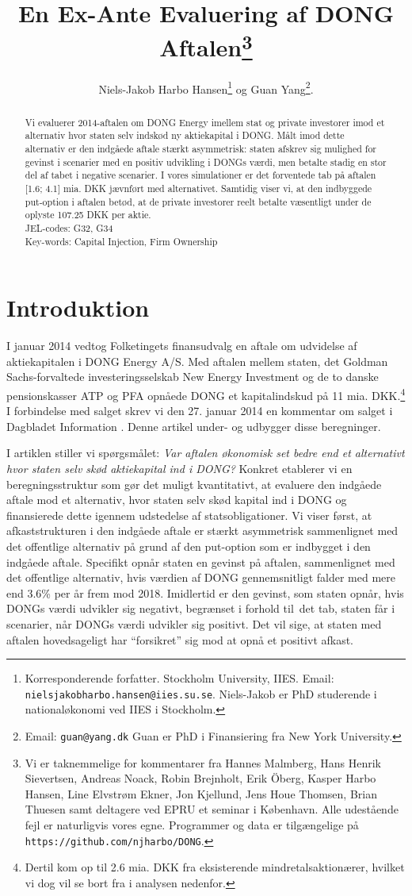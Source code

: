 \documentclass{article}
\title{En Ex-Ante Evaluering af DONG Aftalen\thanks{Vi er taknemmelige for kommentarer fra Hannes Malmberg, Hans Henrik Sievertsen, Andreas Noack, Robin Brejnholt, Erik {\"O}berg, Kasper Harbo Hansen, Line Elvstrøm Ekner, Jon Kjellund,  Jens Houe Thomsen, Brian Thuesen samt deltagere ved EPRU et seminar i København. Alle udestående fejl er naturligvis vores egne.  Programmer og data er tilgængelige på \texttt{https://github.com/njharbo/DONG}.} \\ }
\author{Niels-Jakob Harbo Hansen\thanks{Korresponderende forfatter. Stockholm University, IIES.  Email: \texttt{nielsjakobharbo.hansen@iies.su.se}. Niels-Jakob er PhD studerende i nationaløkonomi ved IIES i Stockholm.} \hspace{0.1 mm} og Guan Yang\thanks{Email: \texttt{guan@yang.dk} Guan er PhD i Finansiering fra New York University.  }. }
\begin{document}
\maketitle

\begin{abstract}
\onehalfspacing
 Vi evaluerer 2014-aftalen om DONG Energy imellem stat og private investorer imod et alternativ hvor staten selv indskød ny aktiekapital i DONG. Målt imod dette alternativ er den indgåede aftale stærkt asymmetrisk: staten afskrev sig mulighed for gevinst i scenarier med en positiv udvikling i DONGs værdi, men betalte stadig en stor del af tabet i negative scenarier. I vores simulationer er det forventede tab på aftalen [1.6; 4.1] mia. DKK jævnført med alternativet. Samtidig viser vi, at den indbyggede put-option i aftalen betød, at de private investorer reelt betalte væsentligt under de oplyste 107.25 DKK per aktie. \\
 JEL-codes: G32, G34 \\
 Key-words: Capital Injection, Firm Ownership
\end{abstract}


\newpage

\section{Introduktion}


I januar 2014 vedtog Folketingets finansudvalg en aftale om udvidelse af aktiekapitalen i DONG Energy A/S. Med aftalen mellem staten, det Goldman Sachs-forvaltede investeringsselskab New Energy Investment og de to danske pensionskasser ATP og PFA opnåede DONG et kapitalindskud på 11 mia. DKK.\footnote{Dertil kom op til 2.6 mia. DKK fra eksisterende mindretalsaktionærer, hvilket vi dog vil se bort fra i analysen nedenfor.} I forbindelse med salget skrev vi den 27. januar 2014 en kommentar om salget i Dagbladet Information \citep{Hansen2014}. Denne artikel under- og udbygger disse beregninger.

I artiklen stiller vi spørgsmålet: \emph{Var aftalen økonomisk set bedre end et alternativt hvor staten selv skød aktiekapital ind i DONG?} Konkret etablerer vi en beregningsstruktur som gør det muligt kvantitativt, at evaluere den indgåede aftale mod et alternativ, hvor staten selv skød kapital ind i DONG og finansierede dette igennem udstedelse af statsobligationer. Vi viser først, at afkaststrukturen i den indgåede aftale er stærkt asymmetrisk sammenlignet med det offentlige alternativ på grund af den put-option som er indbygget i den indgåede aftale. Specifikt opnår staten en gevinst på aftalen, sammenlignet med det offentlige alternativ, hvis værdien af DONG gennemsnitligt falder med mere end 3.6\% per år frem mod 2018. Imidlertid er den gevinst, som staten opnår, hvis DONGs værdi udvikler sig negativt, begrænset i forhold til\ det tab, staten får i scenarier, når DONGs værdi udvikler sig positivt. Det vil sige, at staten med aftalen hovedsageligt har \enquote{forsikret} sig mod at opnå et positivt afkast. 
\end{document}
